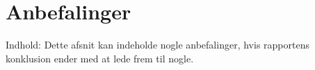 \chapter{Anbefalinger}
Indhold: Dette afsnit kan indeholde nogle anbefalinger, hvis rapportens konklusion ender med at lede frem til nogle.